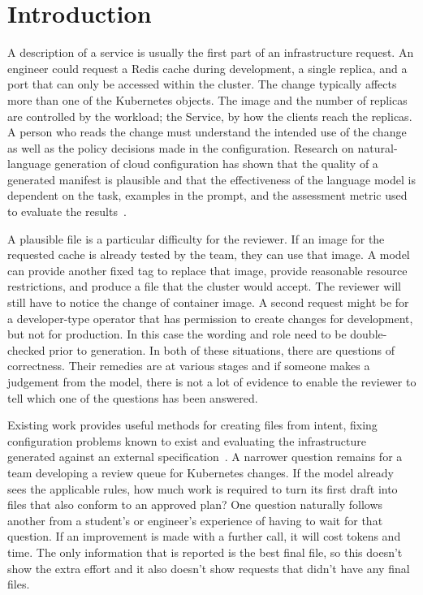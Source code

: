 \documentclass[12pt,onecolumn,draftclsnofoot]{IEEEtran}
\begin{document}
\section{Introduction}
A description of a service is usually the first part of an infrastructure request. An engineer could request a Redis cache during development, a single replica, and a port that can only be accessed within the cluster. The change typically affects more than one of the Kubernetes objects. The image and the number of replicas are controlled by the workload; the Service, by how the clients reach the replicas. A person who reads the change must understand the intended use of the change as well as the policy decisions made in the configuration. Research on natural-language generation of cloud configuration has shown that the quality of a generated manifest is plausible and that the effectiveness of the language model is dependent on the task, examples in the prompt, and the assessment metric used to evaluate the results~\cite{kgen,cloud,iac}.

A plausible file is a particular difficulty for the reviewer. If an image for the requested cache is already tested by the team, they can use that image. A model can provide another fixed tag to replace that image, provide reasonable resource restrictions, and produce a file that the cluster would accept. The reviewer will still have to notice the change of container image. A second request might be for a developer-type operator that has permission to create changes for development, but not for production. In this case the wording and role need to be double-checked prior to generation. In both of these situations, there are questions of correctness. Their remedies are at various stages and if someone makes a judgement from the model, there is not a lot of evidence to enable the reviewer to tell which one of the questions has been answered.

Existing work provides useful methods for creating files from intent, fixing configuration problems known to exist and evaluating the infrastructure generated against an external specification~\cite{kgen,sec,iac,beuter}. A narrower question remains for a team developing a review queue for Kubernetes changes. If the model already sees the applicable rules, how much work is required to turn its first draft into files that also conform to an approved plan? One question naturally follows another from a student's or engineer's experience of having to wait for that question. If an improvement is made with a further call, it will cost tokens and time. The only information that is reported is the best final file, so this doesn't show the extra effort and it also doesn't show requests that didn't have any final files.
\end{document}
